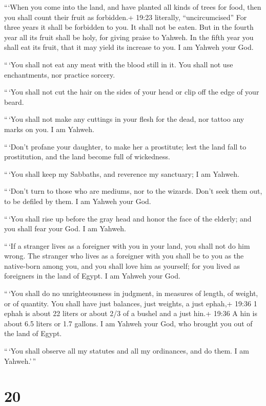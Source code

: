  ```When you come into the land, and have planted all kinds
of trees for food, then you shall count their fruit as forbidden.+ 19:23
literally, ``uncircumcised'' For three years it shall be forbidden to
you. It shall not be eaten.  But in the fourth year all its
fruit shall be holy, for giving praise to Yahweh.  In the
fifth year you shall eat its fruit, that it may yield its increase to
you. I am Yahweh your God.

 ``\,`You shall not eat any meat with the blood still in
it. You shall not use enchantments, nor practice sorcery.

 ``\,`You shall not cut the hair on the sides of your head
or clip off the edge of your beard.

 ``\,`You shall not make any cuttings in your flesh for the
dead, nor tattoo any marks on you. I am Yahweh.

 ``\,`Don't profane your daughter, to make her a
prostitute; lest the land fall to prostitution, and the land become full
of wickedness.

 ``\,`You shall keep my Sabbaths, and reverence my
sanctuary; I am Yahweh.

 ``\,`Don't turn to those who are mediums, nor to the
wizards. Don't seek them out, to be defiled by them. I am Yahweh your
God.

 ``\,`You shall rise up before the gray head and honor the
face of the elderly; and you shall fear your God. I am Yahweh.

 ``\,`If a stranger lives as a foreigner with you in your
land, you shall not do him wrong.  The stranger who lives
as a foreigner with you shall be to you as the native-born among you,
and you shall love him as yourself; for you lived as foreigners in the
land of Egypt. I am Yahweh your God.

 ``\,`You shall do no unrighteousness in judgment, in
measures of length, of weight, or of quantity.  You shall
have just balances, just weights, a just ephah,+ 19:36 1 ephah is about
22 liters or about 2/3 of a bushel and a just hin.+ 19:36 A hin is about
6.5 liters or 1.7 gallons. I am Yahweh your God, who brought you out of
the land of Egypt.

 ``\,`You shall observe all my statutes and all my
ordinances, and do them. I am Yahweh.'\,''

\hypertarget{section-19}{%
\section{20}\label{section-19}}


